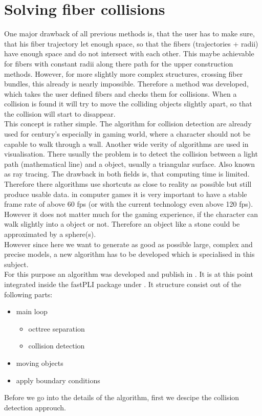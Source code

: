 \section{Solving fiber collisions}
% 
One major drawback of all previous methods is, that the user has to make sure, that his fiber trajectory let enough space, so that the fibers (trajectories + radii) have enough space and do not intersect with each other.
This maybe achievable for fibers with constant radii along there path for the upper construction methods.
However, for more slightly more complex structures, \eg crossing fiber bundles, this already is nearly impossible.
Therefore a method was developed, which takes the user defined fibers and checks them for collisions.
When a collision is found it will try to move the colliding objects slightly apart, so that the collision will start to disappear.
\\
% 
This concept is rather simple.
The algorithm for collision detection are already used for century's especially in gaming world, where a character \eg should not be capable to walk through a wall. Another wide verity of algorithms are used in visualisation. There usually the problem is to detect the collision between a light path (mathematical line) and a object, usually a triangular surface. Also known as ray tracing.
The drawback in both fields is, that computing time is limited.
Therefore there algorithms use shortcuts as close to reality as possible but still produce usable data. \eg in computer games it is very important to have a stable frame rate of above $\num{60}$ \ac{fps} (or with the current technology even above 120 \ac{fps}).
However it does not matter much for the gaming experience, if the character can walk slightly into a object or not.
Therefore an object like a stone could be approximated by a sphere(s).
\\
%
However since here we want to generate as good as possible large, complex and precise models, a new algorithm has to be developed which is specialised in this subject.
% 
\\[\baselineskip]
% 
For this purpose an algorithm was developed and publish in \cite{matuschke2019}.
It is at this point integrated inside the \ac{fastPLI} package under .
It structure consist out of the following parts:
\begin{itemize}
\item main loop
\begin{itemize}
    \item octtree separation
    \item collision detection
\end{itemize}
\item moving objects
\item apply boundary conditions
\end{itemize}
% 
Before we go into the details of the algorithm, first we descipe the collision detection approuch.

